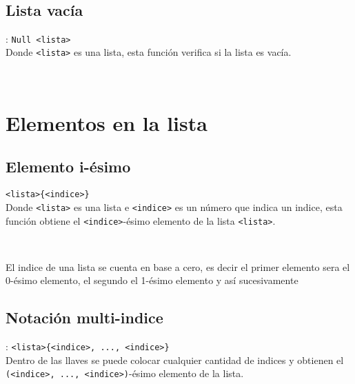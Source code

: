       \begin{fxcode}
         \\
      \end{fxcode}
      
      \subsection*{Lista vacía}: \texttt{Null <lista>}\\
      Donde \texttt{<lista>} es una lista, esta función verifica si la lista es vacía.
      
      \begin{fxcode}
         \\
      \end{fxcode}
      
   \section{Elementos en la lista}
      
      \subsection*{Elemento i-ésimo} \texttt{<lista>\{<indice>\}}\\
      Donde \texttt{<lista>} es una lista e \texttt{<indice>} es un número que indica un indice, esta función obtiene el \texttt{<indice>}-ésimo elemento de la lista \texttt{<lista>}.
      
      \begin{fxcode}
         \\
      \end{fxcode}
      
      El indice de una lista se cuenta en base a cero, es decir el primer elemento sera el 0-ésimo elemento, el segundo el 1-ésimo elemento y así sucesivamente
      
      \subsection*{Notación multi-indice}: \texttt{<lista>\{<indice>, ..., <indice>\}}\\
      Dentro de las llaves se puede colocar cualquier cantidad de indices y obtienen el \texttt{(<indice>, ..., <indice>)}-ésimo elemento de la lista.
      
